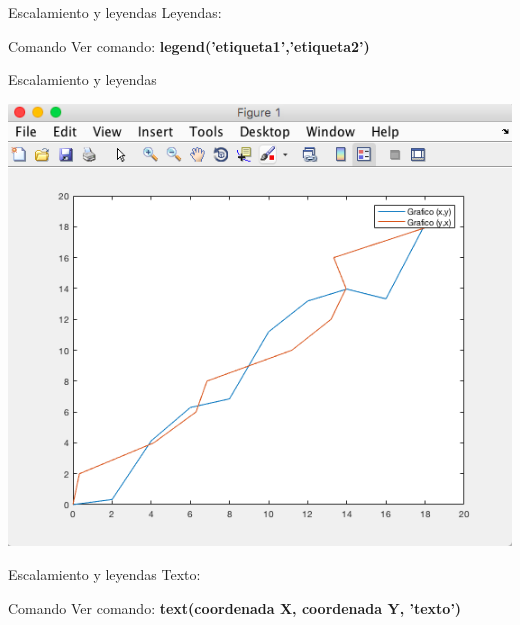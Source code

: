 \documentclass{bredelebeamer}
\begin{document}
\begin{frame}{Escalamiento y leyendas}
Leyendas:\\
\begin{exampleblock}{Comando}
Ver comando: \textbf{legend('etiqueta1','etiqueta2')}
\end{exampleblock}
\end{frame}

\begin{frame}{Escalamiento y leyendas}
\begin{center}
\includegraphics[scale=0.35]{images/pantalla18.png}
\end{center}
\end{frame}

\begin{frame}{Escalamiento y leyendas}
Texto:\\
\begin{exampleblock}{Comando}
Ver comando: \textbf{text(coordenada X, coordenada Y, 'texto')}
\end{exampleblock}
\end{frame}
\end{document}
